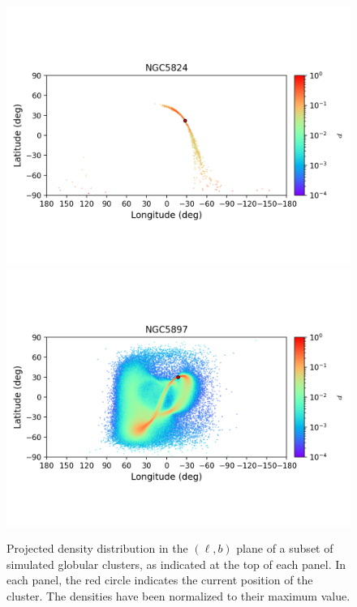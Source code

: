 \begin{figure}
\begin{center}
                \includegraphics[clip=true, trim = 0mm 20mm 0mm 10mm, width=1\columnwidth]{images/error_plots_NGC5824.png}
                \includegraphics[clip=true, trim = 0mm 20mm 0mm 10mm, width=1\columnwidth]{images/error_plots_NGC5897.png}
            \end{center}
            \caption[]{Projected density distribution in the $(\ell, b)$ plane of a subset of simulated globular clusters, as indicated at the top of each panel. In each panel, the red circle indicates the current position of the cluster. The densities have been normalized to their maximum value.}\label{stream6}
        \end{figure}
        
